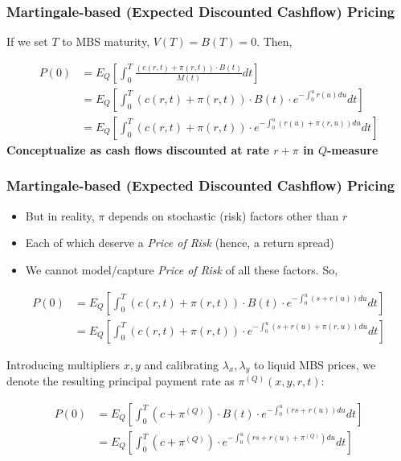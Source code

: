 \documentclass{beamer}
\begin{document}
\begin{frame}
\frametitle{Martingale-based (Expected Discounted Cashflow) Pricing}

If we set $T$ to MBS maturity, $V(T) = B(T) = 0$. Then,

\begin{equation}
\begin{split}
P(0) & = E_Q[\int_0^T \frac {(c(r,t) + \pi(r,t)) \cdot B(t)} {M(t)} dt] \\
& = E_Q[\int_0^T (c(r,t) + \pi(r,t)) \cdot B(t) \cdot e^{-\int_0^u r(u) du} dt] \\
& = E_Q[\int_0^T (c(r,t) + \pi(r,t)) \cdot e^{-\int_0^u (r(u) +\pi(r, u)) du} dt]
\end{split}
\end{equation}
{\bf Conceptualize as cash flows discounted at rate $r + \pi$ in $Q$-measure}
\end{frame}

\begin{frame}
\frametitle{Martingale-based (Expected Discounted Cashflow) Pricing}
\begin{itemize}
\item But in reality, $\pi$ depends on stochastic (risk) factors other than $r$
\item Each of which deserve a {\em Price of Risk} (hence, a return spread)
\item We cannot model/capture {\em Price of Risk} of all these factors. So,
\end{itemize}
\begin{equation}
\begin{split}
P(0) & = E_Q[\int_0^T (c(r,t) + \pi(r,t)) \cdot B(t) \cdot e^{-\int_0^u (s + r(u)) du} dt] \\
& = E_Q[\int_0^T (c(r,t) + \pi(r,t)) \cdot e^{-\int_0^u (s + r(u) + \pi(r, u)) du} dt]
\end{split}
\end{equation}

Introducing multipliers $x, y$ and calibrating $\lambda_x, \lambda_y$ to liquid MBS prices, we denote the resulting principal payment rate as $\pi^{(Q)}(x,y,r,t)$:

\begin{equation}
\begin{split}
P(0) & = E_Q[\int_0^T (c + \pi^{(Q)}) \cdot B(t) \cdot e^{-\int_0^u (rs + r(u)) du} dt] \\
& = E_Q[\int_0^T (c + \pi^{(Q)}) \cdot e^{-\int_0^u (rs + r(u) + \pi^{(Q)}) du} dt]\label{eq:martingale}
\end{split}
\end{equation}
\end{frame}
\end{document}
